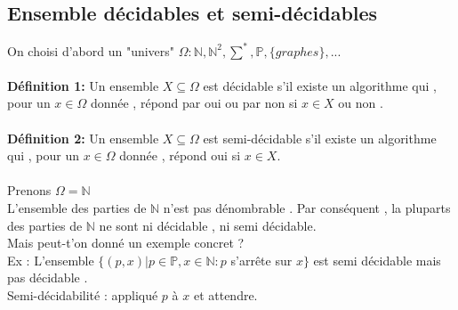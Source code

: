 \documentclass[base.tex]{subfiles}
\begin{document}
\subsection{Ensemble décidables et semi-décidables}
On choisi d'abord un "univers" $\Omega :\mathbb{N},\mathbb{N}^2,\sum^*,\mathbb{P},\{graphes\},...$\\
\\
\textbf{Définition 1:} Un ensemble $X\subseteq \Omega$ est décidable s'il existe un algorithme qui , pour un $x \in \Omega$ donnée , répond par oui ou par non si $x \in X$ ou non .\\
\\
\textbf{Définition 2:} Un ensemble $X\subseteq \Omega$ est semi-décidable s'il existe un algorithme qui , pour un $x\in \Omega$ donnée , répond oui si $x \in X$.
\\
\\
Prenons $\Omega = \mathbb{N}$\\
L'ensemble des parties de $\mathbb{N}$ n'est pas dénombrable . Par conséquent , la pluparts des parties de $\mathbb{N}$ ne sont ni décidable , ni semi décidable. \\
Mais peut-t'on donné un exemple concret ?\\
Ex : L'ensemble $\{(p,x)|p \in \mathbb{P} , x \in \mathbb{N} : p$ s'arrête sur $x\}$ est semi décidable mais pas décidable .\\
Semi-décidabilité : appliqué $p$ à $x$ et attendre.
\end{document}
